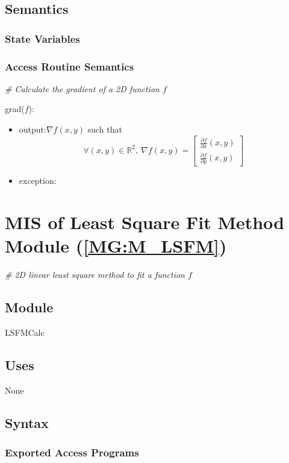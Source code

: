 \documentclass[12pt, titlepage]{article}
\begin{document}
\subsection{Semantics}

\subsubsection{State Variables}


\subsubsection{Access Routine Semantics}

\noindent\textit{{\#} Calculate the gradient of a 2D function $f$} \medskip

\noindent grad($f$):
\begin{itemize} 
\item output:$ \nabla f(x,y)$ such that
\begin{equation*}
\forall (x,y) \in \mathbb{R}^2, \ \nabla f(x,y) = \begin{bmatrix}
\frac{\partial f}{\partial x}(x,y) \\
\frac{\partial f}{\partial y}(x,y)
\end{bmatrix}
\end{equation*}
\item exception: 
\end{itemize}

\section{MIS of Least Square Fit Method Module (\texorpdfstring{\cref{MG:M_LSFM}}))} \label{MIS_LSFM}

\textit{{\#} 2D linear least square method to fit a function $f$} \medskip

\subsection{Module}
LSFMCalc
\subsection{Uses}
None
\subsection{Syntax}

\subsubsection{Exported Access Programs}
\end{document}
